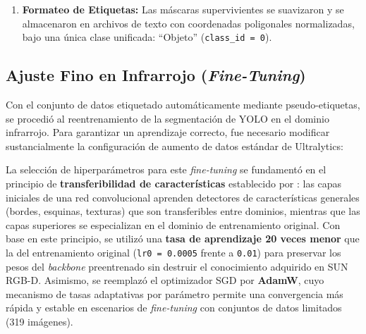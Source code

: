 \documentclass[12pt, a4, twoside, openany]{report}
\begin{document}
\begin{enumerate}
    Es importante destacar que el percentil 80 es un \textbf{parámetro fijo global} aplicado uniformemente a todos los fotogramas, independientemente de las dimensiones del espacio capturado. Este enfoque no escala con el tamaño de la habitación: en una habitación pequeña (p. ej., un pasillo estrecho de 2 m de profundidad), el percentil 80 podría ubicarse a 1.6 m y descartaría erróneamente mobiliario real como objetos de fondo; en una sala grande (p. ej., un salón con doble altura de 10 m de profundidad), el percentil 80 podría ubicarse a 8 m y permitiría que paredes lejanas sean segmentadas como objetos de interés. Esta falta de adaptabilidad impide inherentemente la generalización a distribuciones de profundidad atípicas. La solución robusta sería reemplazar el umbral fijo por un \textbf{criterio adaptativo} basado en estadísticas de la escena (p. ej., la mediana de profundidad del fotograma, el rango intercuartílico o un percentil relativo a la profundidad máxima estimada por el sensor). La implementación de un mecanismo de umbral adaptativo se identifica como \textbf{trabajo futuro} para mejorar la robustez del sistema en escenarios con geometrías distintas a las evaluadas.
    \item \textbf{Formateo de Etiquetas:} Las máscaras supervivientes se suavizaron y se almacenaron en archivos de texto con coordenadas poligonales normalizadas, bajo una única clase unificada: ``Objeto'' (\texttt{class\_id = 0}).
\end{enumerate}

\subsection{Ajuste Fino en Infrarrojo (\textit{Fine-Tuning})}

Con el conjunto de datos etiquetado automáticamente mediante pseudo-etiquetas, se procedió al reentrenamiento de la segmentación de YOLO en el dominio infrarrojo. Para garantizar un aprendizaje correcto, fue necesario modificar sustancialmente la configuración de aumento de datos estándar de Ultralytics:

La selección de hiperparámetros para este \textit{fine-tuning} se fundamentó en el principio de \textbf{transferibilidad de características} establecido por \cite{yosinski2014transferable}: las capas iniciales de una red convolucional aprenden detectores de características generales (bordes, esquinas, texturas) que son transferibles entre dominios, mientras que las capas superiores se especializan en el dominio de entrenamiento original. Con base en este principio, se utilizó una \textbf{tasa de aprendizaje 20 veces menor} que la del entrenamiento original (\texttt{lr0 = 0.0005} frente a \texttt{0.01}) para preservar los pesos del \textit{backbone} preentrenado sin destruir el conocimiento adquirido en SUN RGB-D. Asimismo, se reemplazó el optimizador SGD por \textbf{AdamW}, cuyo mecanismo de tasas adaptativas por parámetro permite una convergencia más rápida y estable en escenarios de \textit{fine-tuning} con conjuntos de datos limitados (319 imágenes).
\end{document}

